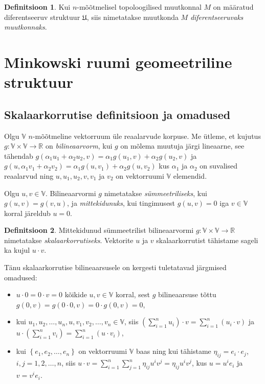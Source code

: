 \documentclass[12pt,a4paper,oneside]{article}
\theoremstyle{plain}
\theoremstyle{definition}
\newtheorem{definitsioon}{Definitsioon}[section]
\numberwithin{equation}{section}
\def\R{{\mathbb R}}
\def\V{{\mathbb V}}
\begin{document}
\begin{definitsioon}
Kui $n$-mõõtmelisel topoloogilised muutkonnal $M$ on mää\-ratud 
diferentseeruv struktuur $\mathfrak{U}$, siis nimetatakse muutkonda 
$M$ \emph{diferentseeruvaks muutkonnaks}.
\end{definitsioon}

\newpage
\section{Minkowski ruumi geomeetriline struktuur}

\subsection{Skalaarkorrutise definitsioon ja omadused}

Olgu $\V$ $n$-mõõtmeline vektorruum üle reaalarvude korpuse. 
Me ütleme, et kujutus $g : \V \times \V 
\rightarrow \R$ on \emph{bilineaarvorm}, kui $g$ on mõlema muutuja 
järgi lineaarne, see tähendab 
$g \left( \alpha_1 u_1 + \alpha_2 u_2, v \right) = 
\alpha_1 g \left( u_1, v \right) + \alpha_2 g \left( u_2, v \right)$ 
ja $g \left( u, \alpha_1 v_1 + \alpha_2 v_2 \right) = 
\alpha_1 g \left( u, v_1 \right) + \alpha_2 g \left( u, v_2 \right)$ 
kus $\alpha_1$ ja $\alpha_2$ on suvalised reaalarvud ning 
$u, u_1, u_2, v, v_1$ ja $v_2$ on vektorruumi $\V$ elemendid. 

Olgu $u, v \in \V$. Bilineaarvormi $g$ nimetatakse 
\emph{sümmeetriliseks}, kui $g \left( u, v \right) = 
g \left(v, u \right)$, ja \emph{mittekidunuks}, kui tingimusest 
$g \left( u, v \right) = 0$ iga $v \in \V$ korral järeldub  
$u = 0$.

\begin{definitsioon}
Mittekidunud sümmeetrilist bilineaarvormi 
$g: \V \times \V \rightarrow \R$ 
nimetatakse \emph{skalaarkorrutiseks}. Vektorite $u$ ja $v$ 
skalaarkorrutist tähistame sageli ka kujul $u \cdot v$.
\end{definitsioon}

Tänu skalaarkorrutise bilineaarsusele on kergesti tuletatavad 
järgmised omadused:
\begin{itemize}
\item $u \cdot 0 = 0 \cdot v = 0$ kõikide $u, v \in \V$ 
korral, sest $g$ bilineaarsuse tõttu $g \left(0, v\right) = 
g \left(0 \cdot 0, v \right) = 0 \cdot g \left(0, v \right) = 0$,
\item kui $u_1, u_2, \dots, u_n, u, v_1, v_2, \dots, v_n \in 
\V$, siis $\left( \sum_{i = 1}^{n} u_i \right) \cdot v = 
\sum_{i = 1}^{n}  \left( u_i \cdot v \right)$ ja 
$u \cdot \left( \sum_{i = 1}^{n} v_i \right) = 
\sum_{i = 1}^{n}  \left( u \cdot v_i \right)$,
\item kui $\left\lbrace e_1, e_2, \dots, e_n \right\rbrace$ on 
vektorruumi $\V$ baas ning kui tähistame $\eta_{ij} = 
e_i \cdot e_j$, $i,j = 1, 2, \dots, n$, siis $u \cdot v = 
\sum_{i = 1}^{n} \sum_{j = 1}^{n} \eta_{ij} u^i v^j = 
\eta_{ij} u^i v^j$, kus $u = u^i e_i$ ja $v = v^i e_i$.
\end{itemize}
\end{document}
